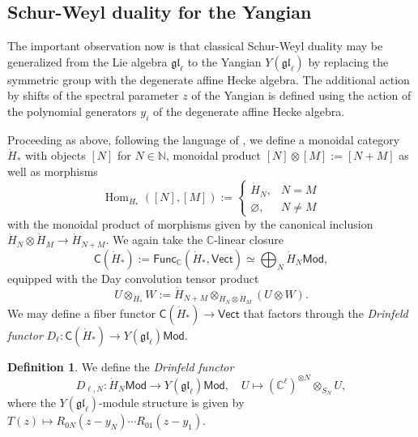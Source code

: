 \documentclass[11pt]{report}
\theoremstyle{definition}
\newtheorem{definition}[theorem]{Definition}
\theoremstyle{remark}
\theoremstyle{remark}
\newcommand{\Hom}{\operatorname{Hom}}
\newcommand{\N}{\mathbb{N}}
\newcommand{\C}{\mathbb{C}}
\begin{document}
\subsection{Schur-Weyl duality for the Yangian}

The important observation now is that classical Schur-Weyl duality may be generalized from the Lie algebra $\mathfrak{gl}_\ell$ to the Yangian $Y(\mathfrak{gl}_\ell)$ by replacing the symmetric group with the degenerate affine Hecke algebra. The additional action by shifts of the spectral parameter $z$ of the Yangian is defined using the action of the polynomial generators $y_i$ of the degenerate affine Hecke algebra.

Proceeding as above, following the language of \cite{article:davydov:2010,article:arakawa:1999}, we define a monoidal category $\dot H_*$ with objects $[N]$ for $N \in \N$, monoidal product $[N] \otimes [M] := [N+M]$ as well as morphisms
\begin{equation*}
\Hom_{\dot H_*}([N],[M]) :=
\begin{cases}
\dot H_N, & N = M \\
\varnothing, & N \neq M
\end{cases}
\end{equation*}
with the monoidal product of morphisms given by the canonical inclusion $\dot H_N \otimes \dot H_M \to \dot H_{N+M}$. We again take the $\C$-linear closure
\begin{equation*}
\mathsf{C}(\dot H_*) := \mathsf{Func}_\C(\dot H_*,\mathsf{Vect}) \simeq \bigoplus_N \dot H_N\mathsf{Mod},
\end{equation*}
equipped with the Day convolution tensor product
\begin{equation*}
U \otimes_{\dot H_*} W := \dot H_{N+M} \otimes_{\dot H_N \otimes \dot H_M} (U \otimes W).
\end{equation*}
We may define a fiber functor $\mathsf{C}(\dot H_*) \to \mathsf{Vect}$ that factors through the \emph{Drinfeld functor} $D_\ell: \mathsf{C}(\dot H_*) \to Y(\mathfrak{gl}_\ell)\mathsf{Mod}$.

\begin{definition}
We define the \emph{Drinfeld functor}
\begin{equation*}
D_{\ell,N}: \dot H_N\mathsf{Mod} \to Y(\mathfrak{gl}_\ell)\mathsf{Mod}, \quad U \mapsto (\C^\ell)^{\otimes N} \otimes_{S_N} U,
\end{equation*}
where the $Y(\mathfrak{gl}_\ell)$-module structure is given by $T(z) \mapsto R_{0N}(z-y_N) \cdots R_{01}(z-y_1)$.
\end{definition}
\end{document}
